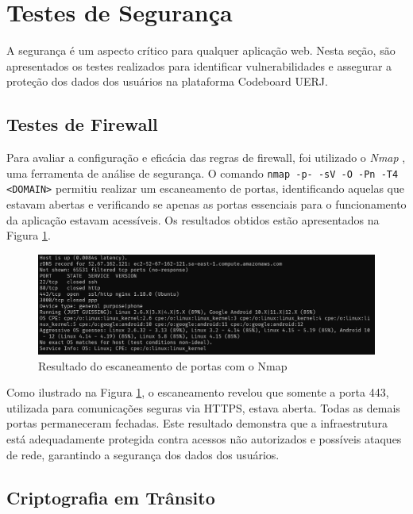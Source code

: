 \section{Testes de Segurança}

A segurança é um aspecto crítico para qualquer aplicação web. Nesta seção, são apresentados os testes realizados para identificar vulnerabilidades e assegurar a proteção dos dados dos usuários na plataforma Codeboard UERJ.

\subsection{Testes de Firewall}

Para avaliar a configuração e eficácia das regras de firewall, foi utilizado o \emph{Nmap} \cite{nmap}, uma ferramenta de análise de segurança. O comando \texttt{nmap -p- -sV -O -Pn -T4 <DOMAIN>} permitiu realizar um escaneamento de portas, identificando aquelas que estavam abertas e verificando se apenas as portas essenciais para o funcionamento da aplicação estavam acessíveis. Os resultados obtidos estão apresentados na Figura \ref{fig:nmap-scan}.

\begin{figure}[H]
    \centering
    \includegraphics[width=1\textwidth]{assets/security-test/nmap-scan.png}
    \caption{Resultado do escaneamento de portas com o Nmap}
    \label{fig:nmap-scan}
\end{figure}

Como ilustrado na Figura \ref{fig:nmap-scan}, o escaneamento revelou que somente a porta 443, utilizada para comunicações seguras via HTTPS, estava aberta. Todas as demais portas permaneceram fechadas. Este resultado demonstra que a infraestrutura está adequadamente protegida contra acessos não autorizados e possíveis ataques de rede, garantindo a segurança dos dados dos usuários.

\subsection{Criptografia em Trânsito}

